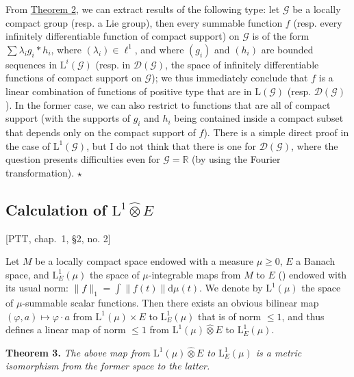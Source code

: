 \documentclass[british]{article}
\newenvironment{itenv}[1]
  {\phantomsection\par\smallskip\noindent\textbf{#1.}\itshape}
  {\par\smallskip}
\begin{document}
From \hyperref[section-1-theorem-2]{Theorem 2}, we can extract results
of the following type: let \({\mathscr{G}}\) be a locally compact group
(resp. a Lie group), then every summable function \(f\) (resp. every
infinitely differentiable function of compact support) on
\({\mathscr{G}}\) is of the form \(\sum\lambda_i g_i*h_i\), where
\((\lambda_i)\in\ell^1\), and where \((g_i)\) and \((h_i)\) are bounded
sequences in \(\mathrm{L}^i({\mathscr{G}})\) (resp. in
\({\mathscr{D}}({\mathscr{G}})\), the space of infinitely differentiable
functions of compact support on \({\mathscr{G}}\)); we thus immediately
conclude that \(f\) is a linear combination of functions of positive
type that are in \(\mathrm{L}({\mathscr{G}})\) (resp.
\({\mathscr{D}}({\mathscr{G}})\)). In the former case, we can also
restrict to functions that are all of compact support (with the supports
of \(g_i\) and \(h_i\) being contained inside a compact subset that
depends only on the compact support of \(f\)). There is a simple direct
proof in the case of \(\mathrm{L}^1({\mathscr{G}})\), but I do not think
that there is one for \({\mathscr{D}}({\mathscr{G}})\), where the
question presents difficulties even for \({\mathscr{G}}=\mathbb{R}\) (by
using the Fourier transformation). \(\star\)

\subsection{\texorpdfstring{Calculation of
\(\mathrm{L}^1\hat{\otimes}E\)}{Calculation of \textbackslash mathrm\{L\}\^{}1\textbackslash hat\{\textbackslash otimes\}E}}\label{section-1.3}

{[}PTT, chap.~1, §2, no. 2{]}

\medskip

Let \(M\) be a locally compact space endowed with a measure
\(\mu\geqslant 0\), \(E\) a Banach space, and \(\mathrm{L}_E^1(\mu)\)
the space of \(\mu\)-integrable maps from \(M\) to \(E\) (\autocite{2})
endowed with its usual norm: \(\|f\|_1=\int\|f(t)\|\mathrm{d}\mu(t)\).
We denote by \(\mathrm{L}^1(\mu)\) the space of \(\mu\)-summable scalar
functions. Then there exists an obvious bilinear map
\((\varphi,a)\mapsto\varphi\cdot a\) from \(\mathrm{L}^1(\mu)\times E\)
to \(\mathrm{L}_E^1(\mu)\) that is of norm \(\leqslant 1\), and thus
defines a linear map of norm \(\leqslant 1\) from
\(\mathrm{L}^1(\mu)\hat{\otimes}E\) to \(\mathrm{L}_E^1(\mu)\).

\protect{}\label{section-1-theorem-3}
\begin{itenv}{Theorem 3}
The above map from \(\mathrm{L}^1(\mu)\hat{\otimes}E\) to
\(\mathrm{L}_E^1(\mu)\) is a metric isomorphism from the former space to
the latter.

\end{itenv}
\end{document}
